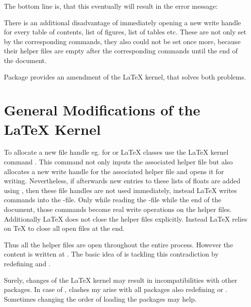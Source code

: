 The bottom line is, that this eventually will result in the error message:

There is an additional disadvantage of immediately opening a new write handle
for every table of contents, list of figures, list of tables etc.  These are
not only set by the corresponding commands, they also could not be set once
more, because their helper files are empty after the corresponding commands
until the end of the document.

Package  provides an amendment of the \LaTeX{} kernel,
that solves both problems.

\section{General Modifications of the \LaTeX{} Kernel}

To allocate a new file handle eg. for  or
 \LaTeX{} classes use the \LaTeX{} kernel command
. This command not only inputs the
associated helper file but also allocates a new write handle for the
associated helper file and opens it for writing. Nevertheless, if afterwards
new entries to these lists of floats are added using ,
then these file handles are not used immediately, instead \LaTeX{} writes
 commands into the
-file. Only while reading the -file while the end of the
document, those  commands become real write operations
on the helper files. Additionally \LaTeX{} does not close the helper files
explicitly. Instead \LaTeX{} relies on \TeX{} to close all open files at
the end.

Thus all the helper files are open throughout the entire process. However the
content is written at . The basic idea of
 is tackling this contradiction by redefining
 and .

Surely, changes of the \LaTeX{} kernel may
result in incompatibilities with other packages. In case of
, clashes my arise with all packages also redefining
 or . Sometimes changing the order of
loading the packages may help.

